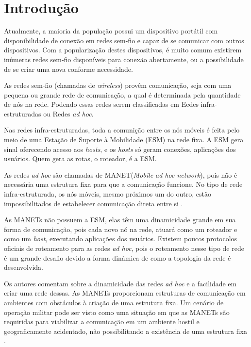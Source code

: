 \section{Introdu\c{c}\~ao} 
Atualmente, a maioria da popula\c{c}\~ao possui um dispositivo port\'atil com disponibilidade de conex\~ao em redes sem-fio e capaz de se comunicar com outros dispositivos. 
Com a populariza\c{c}\~ao destes dispositivos, \'e muito comum existirem in\'umeras redes sem-fio dispon\'iveis para conex\~ao abertamente, ou a possibilidade de se criar uma nova conforme necessidade.

As redes sem-fio (chamadas de \textit{wireless}) prov\^em comunica\c{c}\~ao, seja com uma pequena ou grande rede de comunica\c{c}\~ao, a qual \'e determinada pela quantidade de n\'os na rede. 
Podendo essas redes serem classificadas em Eedes infra-estruturadas ou Redes \textit{ad hoc}.

Nas redes infra-estruturadas, toda a comuni\c{c}\~ao entre os n\'os m\'oveis \'e feita pelo meio de uma Esta\c{c}\~ao de Suporte \`a Mobilidade (ESM) na rede fixa.
A ESM gera sinal oferecendo acesso aos \textit{hosts}, e os \textit{hosts} s\'o geram conex\~oes, aplica\c{c}\~oes dos usu\'arios. Quem gera as rotas, o roteador, \'e a ESM. 

As redes \textit{ad hoc} s\~ao chamadas de MANET(\textit{Mobile ad hoc network}), pois n\~ao \'e necess\'aria uma estrutura fixa para que a comunica\c{c}\~ao funcione.
No tipo de rede infra-estruturada, os n\'os m\'oveis, mesmo pr\'oximos um do outro, est\~ao impossibilitados de estabelecer comunica\c{c}\~ao direta entre si \cite{pereira}.

As MANETs n\~ao possuem a ESM, elas t\^em uma dinamicidade grande em sua forma de comunica\c{c}\~ao, pois cada novo n\'o na rede, atuar\'a como um roteador e como um \textit{host}, executando aplica\c{c}\~oes dos usu\'arios. 
Existem poucos protocolos oficiais de roteamento para as redes \textit{ad hoc}, pois  o roteamento nesse tipo de rede \'e um grande desafio devido a forma din\^ amica de como a topologia da rede \'e desenvolvida.

Os autores \cite{pepe} comentam sobre a dinamicidade das redes \textit{ad hoc} e a facilidade em criar uma rede dessas.
As MANETs proporcionam estruturas de comunica\c{c}\~ao em ambientes com obst\'aculos \`a cria\c{c}\~ao de uma estrutura fixa.
Um cen\'ario de opera\c{c}\~ao militar pode ser visto como uma situa\c{c}\~ao em que as MANETs s\~ao requiridas para viabilizar a comunica\c{c}\~ao em um ambiente hostil e geograficamente acidentado, n\~ao possibilitando a exist\^encia de uma estrutura fixa \cite{schimidt}.

